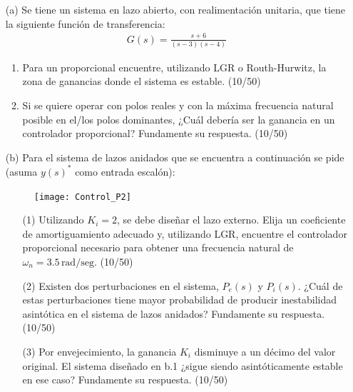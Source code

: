 \documentclass[
  11pt,
  letterpaper,
   addpoints,
   answers
  ]{exam}
\begin{document}
\begin{questions}
\begin{solution}
\end{solution}
    \question 
    \begin{itemize}
        \item[(a)] Se tiene un sistema en lazo abierto, con realimentación unitaria, que tiene la siguiente función de transferencia:
        \begin{align}
            G(s) = \frac{s + 6}{(s - 3)(s - 4)}
        \end{align}
        \begin{enumerate}
            \item Para un proporcional encuentre, utilizando LGR o Routh-Hurwitz, la zona de ganancias donde el sistema es estable. (10/50)
            \item Si se quiere operar con polos reales y con la máxima frecuencia natural posible en el/los polos dominantes, ¿Cuál debería ser la ganancia en un controlador proporcional? Fundamente su respuesta. (10/50)
        \end{enumerate}
        \item[(b)] Para el sistema de lazos anidados que se encuentra a continuación se pide (asuma \(y(s)^*\) como entrada escalón):
        \begin{figure}[h!]
            \centering
            \texttt{[image: Control\_P2]}
        \end{figure}
        \begin{enumerate}
            \item[(1)] Utilizando \(K_i = 2\), se debe diseñar el lazo externo. Elija un coeficiente de amortiguamiento adecuado y, utilizando LGR, encuentre el controlador proporcional necesario para obtener una frecuencia natural de \(\omega_n = 3.5 \, \text{rad/seg}\). (10/50)
            \item[(2)] Existen dos perturbaciones en el sistema, \(P_e(s)\) y \(P_i(s)\). ¿Cuál de estas perturbaciones tiene mayor probabilidad de producir inestabilidad asintótica en el sistema de lazos anidados? Fundamente su respuesta. (10/50)
            \item[(3)] Por envejecimiento, la ganancia \(K_i\) disminuye a un décimo del valor original. El sistema diseñado en b.1 ¿sigue siendo asintóticamente estable en ese caso? Fundamente su respuesta. (10/50)
        \end{enumerate}
    \end{itemize}
    
\begin{solution}

\end{solution}
\end{questions}
\end{document}
